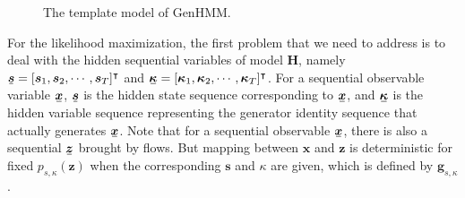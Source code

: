 \begin{figure}[tp!]
  \centering
  \caption{The template model of GenHMM.}\label{chpt7:fig:tenhmm-template}
\end{figure}
For the likelihood maximization, the first problem that we need to address is to deal with the hidden sequential variables of model $\bm{H}$, namely $\ubm{s}=[ \bm{s}_1, \bm{s}_2, \cdots, \bm{s}_T ]^{\intercal}$ and $\ubm{\kappa} = [\bm{\kappa}_1, \bm{\kappa}_2, \cdots, \bm{\kappa}_T]^{\intercal}$. For a sequential observable variable $\ubm{x}$, $\ubm{s}$ is the hidden state sequence corresponding to $\ubm{x}$, and $\ubm{\kappa}$ is the hidden variable sequence representing the generator identity sequence that actually generates $\ubm{x}$. Note that for a sequential observable $\ubm{x}$, there is also a sequential $\ubm{z}$ brought by flows. But mapping between $\bm{x}$ and $\bm{z}$ is deterministic for fixed $p_{s,\kappa}(\bm{z})$ when the corresponding $\bm{s}$ and ${\kappa}$ are given, which is defined by $\bm{g}_{s, \kappa}$.

